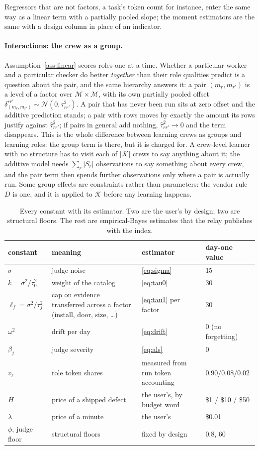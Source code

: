 \documentclass[10pt,a4paper]{article}
\newcommand{\mods}{\mathcal{M}}
\newcommand{\crews}{\mathcal{K}}
\theoremstyle{definition}
\theoremstyle{remark}
\begin{document}
Regressors that are not factors, a task's token count for instance, enter the same way as a linear term with a partially pooled slope; the moment estimators are the same with a design column in place of an indicator.

\paragraph{Interactions: the crew as a group.}
Assumption~\ref{ass:linear} scores roles one at a time. Whether a particular worker and a particular checker do better \emph{together} than their role qualities predict is a question about the pair, and the same hierarchy answers it: a pair $(m_r,m_{r'})$ is a level of a factor over $\mods\times\mods$, with its own partially pooled offset $\delta^{rr'}_{(m_r,m_{r'})}\sim\mathcal N(0,\tau_{rr'}^2)$. A pair that has never been run sits at zero offset and the additive prediction stands; a pair with rows moves by exactly the amount its rows justify against $\hat\tau_{rr'}^2$; if pairs in general add nothing, $\hat\tau_{rr'}^2\to0$ and the term disappears. This is the whole difference between learning crews as groups and learning roles: the group term is there, but it is charged for. A crew-level learner with no structure has to visit each of $|\crews|$ crews to say anything about it; the additive model needs $\sum_r|S_r|$ observations to say something about every crew, and the pair term then spends further observations only where a pair is actually run. Some group effects are constraints rather than parameters: the vendor rule $D$ is one, and it is applied to $\crews$ before any learning happens.

\begin{table}[h]
\centering\small
\begin{tabular}{p{2.0cm}p{5.2cm}p{4.0cm}p{2.6cm}}\toprule
constant & meaning & estimator & day-one value\\\midrule
$\sigma$ & judge noise & \eqref{eq:sigma} & 15\\
$k=\sigma^2/\tau_0^2$ & weight of the catalog & \eqref{eq:tau0} & 30\\
$\ell_f=\sigma^2/\tau_f^2$ & cap on evidence transferred across a factor (install, door, size, \dots) & \eqref{eq:tau1} per factor & 30\\
$\omega^2$ & drift per day & \eqref{eq:drift} & 0 (no forgetting)\\
$\beta_j$ & judge severity & \eqref{eq:als} & 0\\
$v_r$ & role token shares & measured from run token accounting & $0.90/0.08/0.02$\\
\midrule
$H$ & price of a shipped defect & the user's, by budget word & \$1 / \$10 / \$50\\
$\lambda$ & price of a minute & the user's & \$0.01\\
$\phi$, judge floor & structural floors & fixed by design & $0.8$, $60$\\
\bottomrule\end{tabular}
\caption{Every constant with its estimator. Two are the user's by design; two are structural floors. The rest are empirical-Bayes estimates that the relay publishes with the index.}
\label{tab:const}
\end{table}
\end{document}
